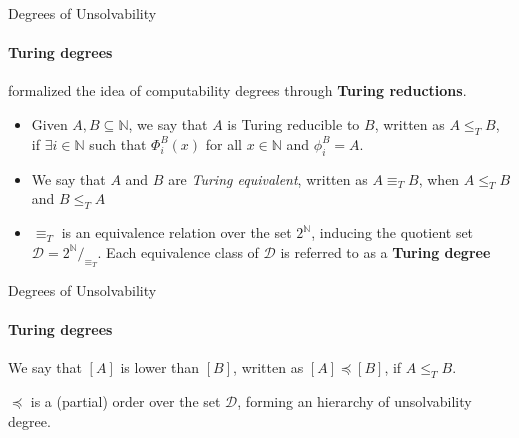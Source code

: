 \documentclass{beamer}
\newcommand{\N}{\mathbb{N}}                     %
\begin{document}
\begin{frame}{Degrees of Unsolvability}
\framesubtitle{Turing degrees}
    \textcite{post_degrees} formalized the idea of computability degrees through \textbf{Turing reductions}.

    \begin{itemize}[<+->]
        \item Given $A,B \subseteq \N$, we say that $A$ is Turing reducible to $B$, written as $A \leq_T B$, if $\exists i \in \N$ such that $\Phi_i^B(x)$ for all $x \in \N$ and $\phi_i^B = A$.
        \item We say that $A$ and $B$ are \textit{Turing equivalent}, written as $A \equiv_T B$, when $A \leq_T B$ and $B \leq_T A$
        \item $\equiv_T$ is an equivalence relation over the set $2^\N$, inducing the quotient set $\mathcal{D} = 2^{\N}/_{\equiv_T}$. Each equivalence class of $\mathcal{D}$ is referred to as a \textbf{Turing degree}
    \end{itemize}
\end{frame}

\begin{frame}{Degrees of Unsolvability}
\framesubtitle{Turing degrees}
    We say that $[A]$ is lower than $[B]$, written as $[A] \preceq [B]$, if $A \leq_T B$.
    
    $\preceq$ is a (partial) order over the set $\mathcal{D}$, forming an hierarchy of unsolvability degree.

\end{frame}
\end{document}
